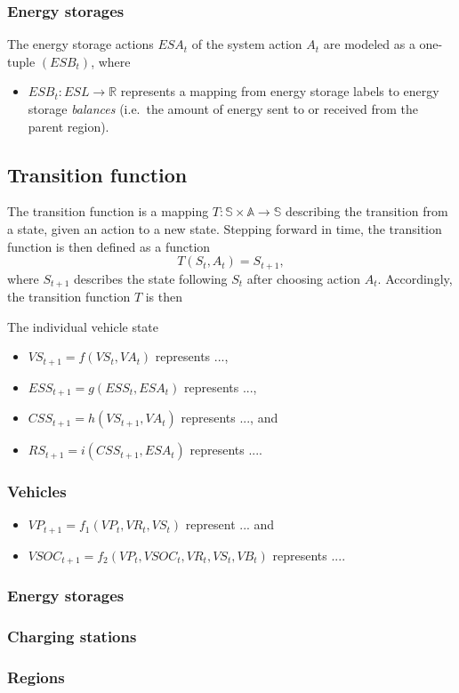 \subsubsection{Energy storages}
\label{actions_storages}

The energy storage actions $ESA_t$ of the system action $A_t$ are modeled as a one-tuple $(ESB_t)$, where
\begin{itemize}
	\item $ESB_t: ESL \rightarrow \mathbb{R}$ represents a mapping from energy storage labels to energy storage \textit{balances} (i.e.\ the amount of energy sent to or received from the parent region).
\end{itemize}

\subsection{Transition function}
\label{transitions}

The transition function is a mapping
$
	T: \mathbb{S} \times \mathbb{A} \rightarrow \mathbb{S}
$ describing the transition from a state, given an action to a new state.
Stepping forward in time, the transition function is then defined as a function
\[
	T(S_t, A_t) = S_{t+1} \mathrm{,}
\]
where $S_{t+1}$ describes the state following $S_t$ after choosing action $A_t$. Accordingly, the transition function $T$ is then

The individual vehicle state
\begin{itemize}
	\item $VS_{t+1} = f(VS_t, VA_t)$ represents ...,
	\item $ESS_{t+1} = g(ESS_t, ESA_t)$ represents ...,
	\item $CSS_{t+1} = h(VS_{t+1}, VA_t)$ represents ..., and
	\item $RS_{t+1} = i(CSS_{t+1}, ESA_t)$ represents ....
\end{itemize}

\subsubsection{Vehicles}
\label{transitions_vehicles}

\begin{itemize}
	\item $VP_{t+1} = f_1(VP_t, VR_t, VS_t)$ represent ... and
	\item $VSOC_{t+1} = f_2(VP_t, VSOC_t, VR_t, VS_t, VB_t)$ represents ....
\end{itemize}

\subsubsection{Energy storages}
\label{transitions_storages}


\subsubsection{Charging stations}
\label{transitions_stations}


\subsubsection{Regions}
\label{transitions_regions}


